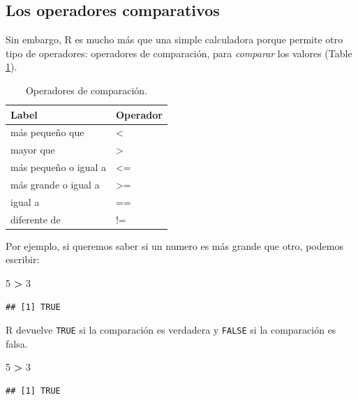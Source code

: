 \documentclass[]{book}
\newenvironment{Shaded}{\begin{snugshade}}{\end{snugshade}}
\newcommand{\DecValTok}[1]{\textcolor[rgb]{0.00,0.00,0.81}{#1}}
\newcommand{\StringTok}[1]{\textcolor[rgb]{0.31,0.60,0.02}{#1}}
\newcommand{\OperatorTok}[1]{\textcolor[rgb]{0.81,0.36,0.00}{\textbf{#1}}}
\begin{document}
\hypertarget{l011opcomp}{\subsection{Los operadores
comparativos}\label{l011opcomp}}

Sin embargo, R es mucho más que una simple calculadora porque permite
otro tipo de operadores: operadores de comparación, para \emph{comparar}
los valores (Table \ref{tab:tabOpCom}).

\begin{table}

\caption{\label{tab:tabOpCom}Operadores de comparación.\label{tab:tabOpCom}}
\centering
\begin{tabular}[t]{l|l}
\hline
Label & Operador\\
\hline
más pequeño que & <\\
\hline
mayor que & >\\
\hline
más pequeño o igual a & <=\\
\hline
más grande o igual a & >=\\
\hline
igual a & ==\\
\hline
diferente de & !=\\
\hline
\end{tabular}
\end{table}

Por ejemplo, si queremos saber si un numero es más grande que otro,
podemos escribir:

\begin{Shaded}
\begin{Highlighting}[]
\DecValTok{5} \OperatorTok{>}\StringTok{ }\DecValTok{3} 
\end{Highlighting}
\end{Shaded}

\begin{verbatim}
## [1] TRUE
\end{verbatim}

R devuelve \texttt{TRUE} si la comparación es verdadera y \texttt{FALSE}
si la comparación es falsa.

\begin{Shaded}
\begin{Highlighting}[]
\DecValTok{5} \OperatorTok{>}\StringTok{ }\DecValTok{3}
\end{Highlighting}
\end{Shaded}

\begin{verbatim}
## [1] TRUE
\end{verbatim}
\end{document}
